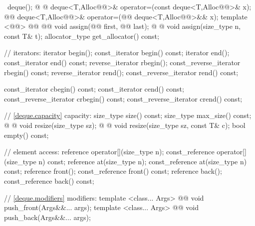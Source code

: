 \documentclass[american,twoside]{book}
\begin{document}
\begin{codeblock}
{{   ~deque();
    @ @
      deque<T,Alloc@@>& operator=(const deque<T,Alloc@@>& x);
    @@
      deque<T,Alloc@@>& operator=(@@ deque<T,Alloc@@>&& x);
    template <@@>
      @@
            @@
      void assign(@@ first, @@ last);
    @ @ 
      void assign(size_type n, const T& t);
    allocator_type get_allocator() const;

    // iterators:
    iterator               begin();
    const_iterator         begin() const;
    iterator               end();
    const_iterator         end() const;
    reverse_iterator       rbegin();
    const_reverse_iterator rbegin() const;
    reverse_iterator       rend();
    const_reverse_iterator rend() const;

    const_iterator         cbegin() const;
    const_iterator         cend() const;
    const_reverse_iterator crbegin() const;
    const_reverse_iterator crend() const;

    // \ref{deque.capacity} capacity:
    size_type size() const;
    size_type max_size() const;
    @  @ 
      void resize(size_type sz);
    @ @
      void resize(size_type sz, const T& c);
    bool empty() const;

    // element access:
    reference       operator[](size_type n);
    const_reference operator[](size_type n) const;
    reference       at(size_type n);
    const_reference at(size_type n) const;
    reference       front();
    const_reference front() const;
    reference       back();
    const_reference back() const;

    // \ref{deque.modifiers} modifiers:
    template <class... Args> 
      @@ 
      void push_front(Args&&... args);
    template <class... Args> 
      @@ 
      void push_back(Args&&... args);

}}
\end{codeblock}
\end{document}
